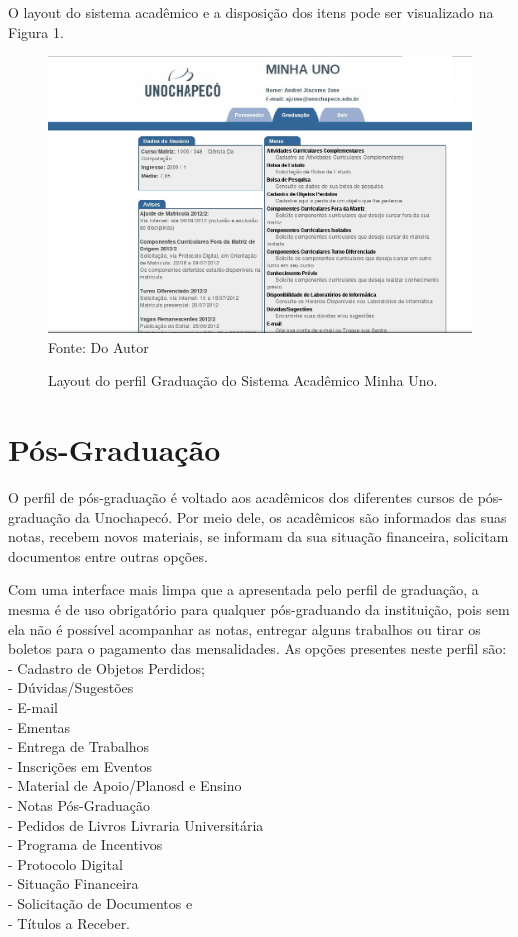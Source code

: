 O layout do sistema acadêmico e a disposição dos itens pode ser visualizado na Figura 1.

\begin{figure}[!htb]
     \centering
     \caption[Layout do Sistema - Perfil Graduação]{Layout do perfil Graduação do Sistema Acadêmico Minha Uno.}
     \includegraphics[scale=0.3]{imagens/GraduacaoCorrigida.png}
     \\ Fonte: Do Autor
\end{figure}

\newpage
\section{Pós-Graduação}
O perfil de pós-graduação é voltado aos acadêmicos dos diferentes cursos de pós-graduação da Unochapecó. 
Por meio dele, os acadêmicos são informados das  suas notas, recebem novos materiais, 
se informam da sua situação financeira, solicitam documentos entre outras opções.

Com uma interface mais limpa que a apresentada pelo perfil de graduação, a mesma é de uso obrigatório para qualquer 
pós-graduando da instituição, pois sem ela não é possível acompanhar as notas, entregar alguns trabalhos ou 
tirar os boletos para o pagamento das mensalidades. As opções presentes neste perfil são: \\
- Cadastro de Objetos Perdidos; \\
- Dúvidas/Sugestões \\
- E-mail \\
- Ementas \\
- Entrega de Trabalhos \\
- Inscrições em Eventos \\
- Material de Apoio/Planosd e Ensino \\
- Notas Pós-Graduação \\
- Pedidos de Livros Livraria Universitária \\
- Programa de Incentivos \\
- Protocolo Digital \\
- Situação Financeira \\
- Solicitação de Documentos e \\
- Títulos a Receber. \\

